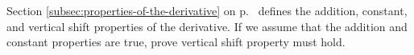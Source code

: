Section \ref{subsec:properties-of-the-derivative} on p.~\pageref{subsec:properties-of-the-derivative}
defines the addition, constant, and vertical shift properties of the derivative.
If we assume that the addition and constant properties are true, prove vertical
shift property must hold.
